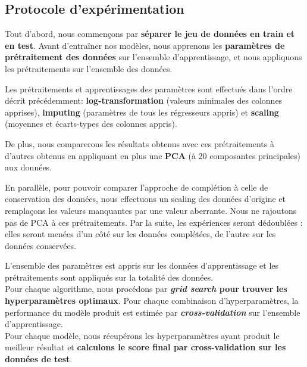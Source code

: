 \documentclass[12pt]{article}
\begin{document}
\subsection{Protocole d'expérimentation} 

Tout d'abord, nous commençons par \textbf{séparer le jeu de données en train et
en test}.  Avant d'entraîner nos modèles, nous apprenons les \textbf{paramètres
de prétraitement des données} sur l'ensemble d'apprentissage, et nous appliquons
les prétraitements sur l'ensemble des données. 

Les prétraitements et apprentissages des paramètres sont effectués dans l'ordre
décrit précédemment: \textbf{log-transformation} (valeurs minimales des colonnes
apprises), \textbf{imputing} (paramètres de tous les régresseurs appris) et
\textbf{scaling} (moyennes et écarts-types des colonnes appris).
\begin{mdframed}[hidealllines=true,backgroundcolor=blue!20] De plus, nous
    comparerons les résultats obtenus avec ces prétraitements à d'autres obtenus
    en appliquant en plus une \textbf{PCA} (à 20 composantes principales) aux
    données.
\end{mdframed}

\begin{mdframed}[hidealllines=true,backgroundcolor=blue!20] En parallèle, pour
    pouvoir comparer l'approche de complétion à celle de conservation des
    données, nous effectuons un scaling des données d'origine et remplaçons les
    valeurs manquantes par une valeur aberrante. Nous ne rajoutons pas de PCA à
    ces prétraitements. Par la suite, les expériences seront dédoublées : elles
    seront menées d'un côté sur les données complétées, de l'autre sur les
    données conservées.  \end{mdframed}

L'ensemble des paramètres est appris sur les données d'apprentissage et les
prétraitements sont appliqués sur la totalité des données. \\

Pour chaque algorithme, nous procédons par \textbf{\emph{grid search} pour
trouver les hyperparamètres optimaux}. Pour chaque combinaison
d'hyperparamètres, la performance du modèle produit est estimée par
\textbf{\emph{cross-validation}} sur l'ensemble d'apprentissage. \\

Pour chaque modèle, nous récupérons les hyperparamètres ayant produit le
meilleur résultat et \textbf{calculons le score final par cross-validation sur les
données de test}. \\
\end{document}
